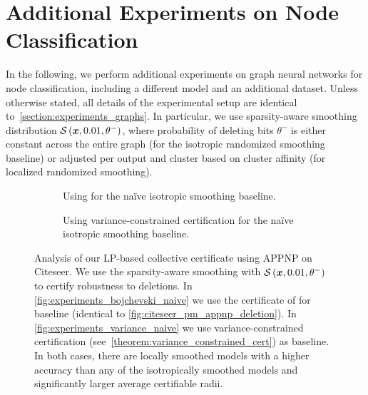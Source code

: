 \vfill

\clearpage

\section{Additional Experiments on Node Classification}\label{section:extra_node_experiments}
In the following, we perform additional experiments on graph neural networks for node classification, including a different model and an additional dataset.
Unless otherwise stated, all details of the experimental setup are identical to~\autoref{section:experiments_graphs}. In particular, we use sparsity-aware smoothing distribution $\mathcal{S}\left({\bm{x}}, 0.01, \theta^{-}\right)$, where probability of deleting bits $\theta^{-}$ is either constant across the entire graph (for the isotropic randomized smoothing baseline) or adjusted per output and cluster based on cluster affinity (for localized randomized smoothing).



\begin{figure}[ht]
    \vskip 0.2in
    \centering
    \begin{subfigure}[b]{0.49\textwidth}
        \resizebox{\textwidth}{!}{}
        \caption{Using \citep{Bojchevski2020} for the na\"ive isotropic smoothing baseline.}
        \label{fig:experiments_bojchevski_naive}
    \end{subfigure}
    \hfill
    \begin{subfigure}[b]{0.49\textwidth}
        \resizebox{\textwidth}{!}{}
        \caption{Using variance-constrained certification  for the na\"ive isotropic smoothing baseline.}
        \label{fig:experiments_variance_naive}
    \end{subfigure}
    \caption{Analysis of our LP-based collective certificate using APPNP on Citeseer.
    We use the sparsity-aware smoothing with $\mathcal{S}\left({\bm{x}},0.01,\theta^{-}\right)$ to certify robustness to deletions.
    In \autoref{fig:experiments_bojchevski_naive} we use the certificate of \citet{Bojchevski2020} for baseline (identical to \autoref{fig:citeseer_pm_appnp_deletion}).
    In \autoref{fig:experiments_variance_naive} we use variance-constrained certification (see~\autoref{theorem:variance_constrained_cert}) as baseline.
    In both cases, there are locally smoothed models with a higher accuracy than any of the isotropically smoothed models
    and significantly larger average certifiable radii.}
    \label{fig:experiments_bojchevski_vs_variance_baseline}
    \vskip -0.2in
\end{figure}


